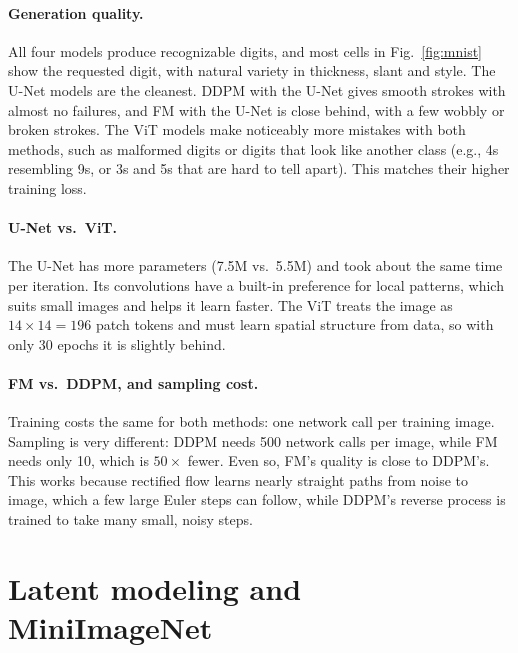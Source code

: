 \documentclass[11pt]{article}
\begin{document}
\paragraph{Generation quality.} All four models produce recognizable digits, and most cells in
Fig.~\ref{fig:mnist} show the requested digit, with natural variety in thickness, slant and style. The
U-Net models are the cleanest. DDPM with the U-Net gives smooth strokes with almost no failures, and FM
with the U-Net is close behind, with a few wobbly or broken strokes. The ViT models make noticeably more
mistakes with both methods, such as malformed digits or digits that look like another class (e.g., 4s
resembling 9s, or 3s and 5s that are hard to tell apart). This matches their higher training loss.\MNISTFIDsentence

\paragraph{U-Net vs.\ ViT.} The U-Net has more parameters (7.5M vs.\ 5.5M) and took about the same time
per iteration. Its convolutions have a built-in preference for local patterns, which suits small
images and helps it learn faster. The ViT treats the image as $14\times14=196$ patch tokens and must
learn spatial structure from data, so with only 30 epochs it is slightly behind.

\paragraph{FM vs.\ DDPM, and sampling cost.} Training costs the same for both methods: one network
call per training image. Sampling is very different: DDPM needs 500 network calls per image, while FM
needs only 10, which is $50\times$ fewer. Even so, FM's quality is close to DDPM's. This works because
rectified flow learns nearly straight paths from noise to image, which a few large Euler steps can
follow, while DDPM's reverse process is trained to take many small, noisy steps.\MNISTtimesentence

\section{Latent modeling and MiniImageNet}
\end{document}
